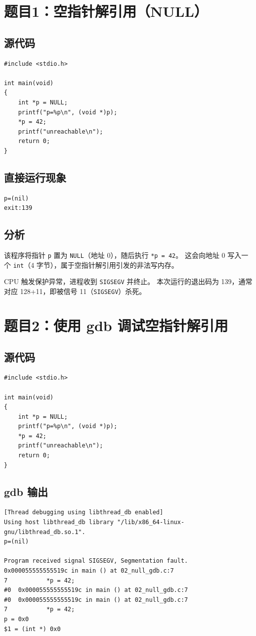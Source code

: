 \documentclass[fleqn]{ctexart}
\begin{document}
\section*{题目1：空指针解引用（NULL）}
\subsection*{源代码}
\begin{verbatim}
#include <stdio.h>

int main(void)
{
	int *p = NULL;
	printf("p=%p\n", (void *)p);
	*p = 42;
	printf("unreachable\n");
	return 0;
}
\end{verbatim}

\subsection*{直接运行现象}
\begin{verbatim}
p=(nil)
exit:139
\end{verbatim}

\subsection*{分析}
该程序将指针 \verb|p| 置为 \verb|NULL|（地址 0），随后执行 \verb|*p = 42|。
这会向地址 0 写入一个 \verb|int|（4 字节），属于空指针解引用引发的非法写内存。

CPU 触发保护异常，进程收到 \verb|SIGSEGV| 并终止。
本次运行的退出码为 139，通常对应 128+11，即被信号 11（\verb|SIGSEGV|）杀死。


\section*{题目2：使用 gdb 调试空指针解引用}
\subsection*{源代码}
\begin{verbatim}
#include <stdio.h>

int main(void)
{
	int *p = NULL;
	printf("p=%p\n", (void *)p);
	*p = 42;
	printf("unreachable\n");
	return 0;
}
\end{verbatim}

\subsection*{gdb 输出}
\begin{verbatim}
[Thread debugging using libthread_db enabled]
Using host libthread_db library "/lib/x86_64-linux-gnu/libthread_db.so.1".
p=(nil)

Program received signal SIGSEGV, Segmentation fault.
0x000055555555519c in main () at 02_null_gdb.c:7
7           *p = 42;
#0  0x000055555555519c in main () at 02_null_gdb.c:7
#0  0x000055555555519c in main () at 02_null_gdb.c:7
7           *p = 42;
p = 0x0
$1 = (int *) 0x0
\end{verbatim}
\end{document}
